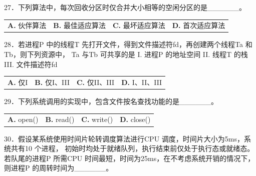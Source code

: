 \documentclass[UTF8,11pt]{ctexart}
\begin{document}
27．下列算法中，每次回收分区时仅合并大小相等的空闲分区的是\_\_\_\_\_\_。


\begin{center}\begin{tabular}{>{\raggedright\arraybackslash}p{\dimexpr(\linewidth-8\tabcolsep)/4\relax}>{\raggedright\arraybackslash}p{\dimexpr(\linewidth-8\tabcolsep)/4\relax}>{\raggedright\arraybackslash}p{\dimexpr(\linewidth-8\tabcolsep)/4\relax}>{\raggedright\arraybackslash}p{\dimexpr(\linewidth-8\tabcolsep)/4\relax}}
\textbf{A.} 伙伴算法 & \textbf{B.} 最佳适应算法 & \textbf{C.} 最坏适应算法 & \textbf{D.} 首次适应算法\\[.35em]\end{tabular}\end{center}

28．若进程P 中的线程T 先打开文件，得到文件描述符fd，再创建两个线程Ta 和Tb，则下列资源中， Ta 与Tb 可共享的是 I. 进程P 的地址空间 II. 线程T 的栈 III. 文件描述符fd


\begin{center}\begin{tabular}{>{\raggedright\arraybackslash}p{\dimexpr(\linewidth-8\tabcolsep)/4\relax}>{\raggedright\arraybackslash}p{\dimexpr(\linewidth-8\tabcolsep)/4\relax}>{\raggedright\arraybackslash}p{\dimexpr(\linewidth-8\tabcolsep)/4\relax}>{\raggedright\arraybackslash}p{\dimexpr(\linewidth-8\tabcolsep)/4\relax}}
\textbf{A.} 仅I & \textbf{B.} 仅I、III & \textbf{C.} 仅II、III & \textbf{D.} I、II、III\\[.35em]\end{tabular}\end{center}

29．下列系统调用的实现中，包含文件按名查找功能的是\_\_\_\_\_\_。


\begin{center}\begin{tabular}{>{\raggedright\arraybackslash}p{\dimexpr(\linewidth-8\tabcolsep)/4\relax}>{\raggedright\arraybackslash}p{\dimexpr(\linewidth-8\tabcolsep)/4\relax}>{\raggedright\arraybackslash}p{\dimexpr(\linewidth-8\tabcolsep)/4\relax}>{\raggedright\arraybackslash}p{\dimexpr(\linewidth-8\tabcolsep)/4\relax}}
\textbf{A.} open() & \textbf{B.} read() & \textbf{C.} write() & \textbf{D.} close()\\[.35em]\end{tabular}\end{center}

30．假设某系统使用时间片轮转调度算法进行CPU 调度，时间片大小为5ms，系统共有10 个进程， 初始时均处于就绪队列，执行结束前仅处于执行态或就绪态。若队尾的进程P 所需CPU 时间最短，时间为25ms，在不考虑系统开销的情况下，则进程P 的周转时间为\_\_\_\_\_\_。
\end{document}
